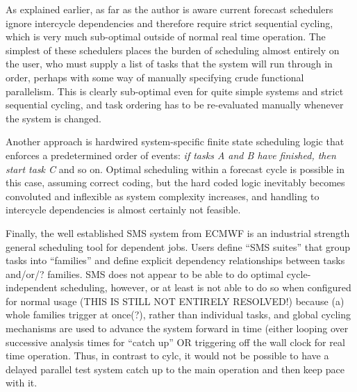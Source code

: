 \documentclass[11pt,a4paper]{article}
\begin{document}
As explained earlier, as far as the author is aware current forecast
schedulers ignore intercycle dependencies and therefore require
strict sequential cycling, which is very much sub-optimal outside of
normal real time operation. The simplest of these schedulers places the
burden of scheduling almost entirely on the user, who must supply a list
of tasks that the system will run through in order, perhaps with some
way of manually specifying crude functional parallelism.  This is
clearly sub-optimal even for quite simple systems and strict sequential
cycling, and task ordering has to be re-evaluated manually whenever the
system is changed. 

Another approach is hardwired system-specific finite state scheduling
logic that enforces a predetermined order of events: {\em if tasks A and
B have finished, then start task C} and so on. Optimal scheduling within
a forecast cycle is possible in this case, assuming correct coding, but
the hard coded logic inevitably becomes convoluted and inflexible as
system complexity increases, and handling to intercycle dependencies is
almost certainly not feasible.  

Finally, the well established SMS system from ECMWF is an industrial
strength general scheduling tool for dependent jobs. Users define ``SMS
suites'' that group tasks into ``families'' and define explicit
dependency relationships between tasks and/or/? families. SMS does not
appear to be able to do optimal cycle-independent scheduling, however,
or at least is not able to do so when configured for normal usage (THIS
IS STILL NOT ENTIRELY RESOLVED!) because (a) whole families trigger 
at once(?), rather than individual tasks, and global cycling mechanisms
are used to advance the system forward in time (either looping
over successive analysis times for ``catch up'' OR triggering off the
wall clock for real time operation. Thus, in contrast to cylc, it would
not be possible to have a delayed parallel test system catch up to the
main operation and then keep pace with it.

\end{document}
